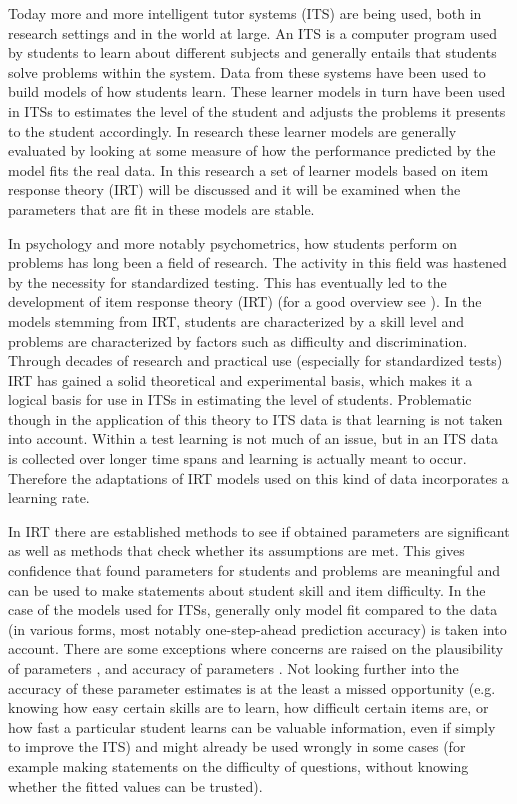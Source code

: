 \documentclass{scrartcl}
\begin{document}
Today more and more intelligent tutor systems (ITS) are being used, both in research settings and in the world at large. An ITS is a computer program used by students to learn about different subjects and generally entails that students solve problems within the system. Data from these systems have been used to build models of how students learn. These learner models in turn have been used in ITSs to estimates the level of the student and adjusts the problems it presents to the student accordingly. In research these learner models are generally evaluated by looking at some measure of how the performance predicted by the model fits the real data. In this research a set of learner models based on item response theory (IRT) will be discussed and it will be examined when the parameters that are fit in these models are stable.

In psychology and more notably psychometrics, how students perform on problems has long been a field of research. The activity in this field was hastened by the necessity for standardized testing. This has eventually led to the development of item response theory (IRT) (for a good overview see \cite{hambleton}). In the models stemming from IRT, students are characterized by a skill level and problems are characterized by factors such as difficulty and discrimination. Through decades of research and practical use (especially for standardized tests) IRT has gained a solid theoretical and experimental basis, which makes it a logical basis for use in ITSs in estimating the level of students. Problematic though in the application of this theory to ITS data is that learning is not taken into account. Within a test learning is not much of an issue, but in an ITS data is collected over longer time spans and learning is actually meant to occur. Therefore the adaptations of IRT models used on this kind of data incorporates a learning rate.

In IRT there are established methods to see if obtained parameters are significant as well as methods that check whether its assumptions are met. This gives confidence that found parameters for students and problems are meaningful and can be used to make statements about student skill and item difficulty. In the case of the models used for ITSs, generally only model fit compared to the data (in various forms, most notably one-step-ahead prediction accuracy) is taken into account. There are some exceptions where concerns are raised on the plausibility of parameters \cite{ktpfa}, \cite{knowledgeproblem} and accuracy of parameters \cite{blackart}. Not looking further into the accuracy of these parameter estimates is at the least a missed opportunity (e.g. knowing how easy certain skills are to learn, how difficult certain items are, or how fast a particular student learns can be valuable information, even if simply to improve the ITS) and might already be used wrongly in some cases (for example making statements on the difficulty of questions, without knowing whether the fitted values can be trusted).
\end{document}
